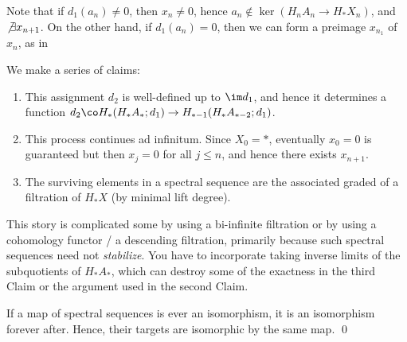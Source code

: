 \noindent Note that if $d_1(a_n) \ne 0$, then $x_n \ne 0$, hence $a_n \not\in \ker(H_n A_n \to H_* X_n)$, and $\not\exists x_{n+1}$.  On the other hand, if $d_1(a_n) = 0$, then we can form a preimage $x_{n_1}$ of $x_n$, as in

\begin{center}
\end{center}

We make a series of claims:
\begin{enumerate}
    \item This assignment $d_2$ is well-defined up to $\im d_1$, and hence it determines a function $d_2\co H_*(H_* A_*; d_1) \to H_{*-1}(H_* A_{*-2}; d_1)$.
    \item This process continues ad infinitum.  Since $X_0 = *$, eventually $x_0 = 0$ is guaranteed but then $x_j = 0$ for all $j \le n$, and hence there exists $x_{n+1}$.
    \item The surviving elements in a spectral sequence are the associated graded of a filtration of $H_* X$ (by minimal lift degree).
\end{enumerate}

\begin{remark}
This story is complicated some by using a bi-infinite filtration or by using a cohomology functor / a descending filtration, primarily because such spectral sequences need not \emph{stabilize}.  You have to incorporate taking inverse limits of the subquotients of $H_* A_*$, which can destroy some of the exactness in the third Claim or the argument used in the second Claim.
\end{remark}

\begin{lemma}
If a map of spectral sequences is ever an isomorphism, it is an isomorphism forever after.  Hence, their targets are isomorphic by the same map. \qed
\end{lemma}

